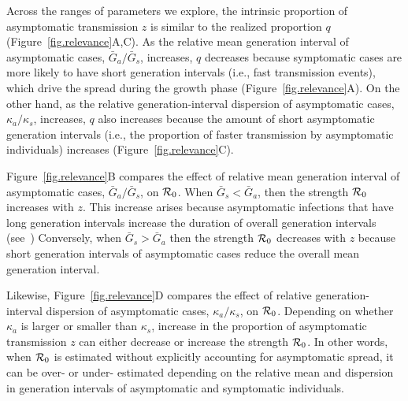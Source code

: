 Across the ranges of parameters we explore, the intrinsic proportion of asymptomatic transmission $z$ is similar to the realized proportion $q$ (Figure~\ref{fig.relevance}A,C).
As the relative mean generation interval of asymptomatic cases, $\bar G_a/\bar G_s$, increases, $q$ decreases because symptomatic cases are more likely to have short generation intervals (i.e., fast transmission events), which drive the spread during the growth phase (Figure~\ref{fig.relevance}A).
On the other hand, as the relative generation-interval dispersion of asymptomatic cases, $\kappa_a/\kappa_s$, increases, $q$ also increases because the amount of short asymptomatic generation intervals (i.e., the proportion of faster transmission by asymptomatic individuals) increases (Figure~\ref{fig.relevance}C).

Figure~\ref{fig.relevance}B compares the effect of relative mean generation interval of asymptomatic cases, $\bar G_a/\bar G_s$, on ${\cal{R}}_0$.
When $\bar G_s < \bar G_a$, then the strength ${\cal{R}}_0$ increases with $z$.
This increase arises because asymptomatic infections that have long generation intervals increase the duration of overall generation intervals (see~\citep{park_2019practical})
Conversely, when $\bar G_s > \bar G_a$ then the strength ${\cal{R}}_0$ decreases with $z$ because short generation intervals of asymptomatic cases reduce the overall mean generation interval.

Likewise, Figure~\ref{fig.relevance}D compares the effect of relative generation-interval dispersion of asymptomatic cases, $\kappa_a/\kappa_s$, on ${\cal{R}}_0$.
Depending on whether $\kappa_a$ is larger or smaller than $\kappa_s$, increase in the proportion of asymptomatic transmission $z$ can either decrease or increase the strength ${\cal{R}}_0$.
In other words, when ${\cal{R}}_0$ is estimated without explicitly accounting for asymptomatic spread, it can be over- or under- estimated depending on the relative mean and dispersion in generation intervals of asymptomatic and symptomatic individuals.

